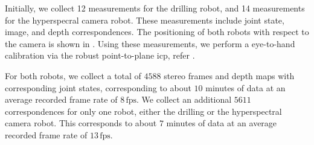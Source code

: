 Initially, we collect 12 measurements for the drilling robot, and 14 measurements for the hyperspecral camera robot. These measurements include joint state, image, and depth correspondences. The positioning of both robots with respect to the camera is shown in . Using these measurements, we perform a eye-to-hand calibration via the robust point-to-plane \acrshort{icp}, refer . 

For both robots, we collect a total of $4588$ stereo frames and depth maps with corresponding joint states, corresponding to about $10$ minutes of data at an average recorded frame rate of $8\,\text{fps}$. We collect an additional $5611$ correspondences for only one robot, either the drilling or the hyperspectral camera robot. This corresponds to about $7$ minutes of data at an average recorded frame rate of $13\,\text{fps}$.

